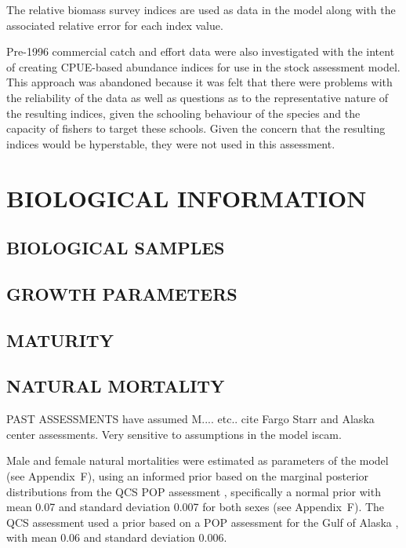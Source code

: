 The relative biomass survey indices are used as data in the model along with the associated relative error for each index value.

Pre-1996 commercial catch and effort data were also investigated with the intent of creating CPUE-based abundance indices for use in the stock assessment model. This approach was abandoned because it was felt that there were problems with the reliability of the data as well as questions as to the representative nature of the resulting indices, given the schooling behaviour of the species and the capacity of fishers to target these schools. Given the concern that the resulting indices would be hyperstable, they were not used in this assessment.

\clearpage

\section{BIOLOGICAL INFORMATION}

\subsection{BIOLOGICAL SAMPLES}

\subsection{GROWTH PARAMETERS}

\subsection{MATURITY}

\subsection{NATURAL MORTALITY}

PAST ASSESSMENTS have assumed M.... etc.. cite Fargo Starr and Alaska center assessments. Very sensitive to assumptions in the model iscam.

Male and female natural mortalities were estimated as parameters of the model (see Appendix~F), using an informed prior based on the marginal posterior distributions from the QCS POP assessment , specifically a normal prior with mean 0.07 and standard deviation 0.007 for both sexes (see Appendix~F). The QCS assessment used a prior based on a POP assessment for the Gulf of Alaska , with mean 0.06 and standard deviation 0.006.

